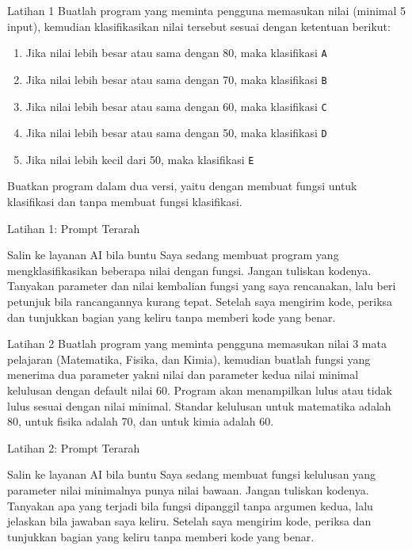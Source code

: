 \documentclass[aspectratio=169, table]{beamer}
\begin{document}
\begin{frame}[fragile,allowframebreaks=0.8]{Latihan 1}
\footnotesize
Buatlah program yang meminta pengguna memasukan nilai (minimal 5 input), kemudian klasifikasikan nilai tersebut sesuai dengan ketentuan berikut:
    \begin{enumerate}
        \item Jika nilai lebih besar atau sama dengan 80, maka klasifikasi \texttt{A}
        \item Jika nilai lebih besar atau sama dengan 70, maka klasifikasi \texttt{B}
        \item Jika nilai lebih besar atau sama dengan 60, maka klasifikasi \texttt{C}
        \item Jika nilai lebih besar atau sama dengan 50, maka klasifikasi \texttt{D}
        \item Jika nilai lebih kecil dari 50, maka klasifikasi \texttt{E}
    \end{enumerate}
    Buatkan program dalam dua versi, yaitu dengan membuat fungsi untuk klasifikasi dan tanpa membuat fungsi klasifikasi.
\end{frame}

\begin{frame}{Latihan 1: Prompt Terarah}
\begin{block}{Salin ke layanan AI bila buntu}
\small Saya sedang membuat program yang mengklasifikasikan beberapa nilai dengan fungsi. Jangan tuliskan kodenya. Tanyakan parameter dan nilai kembalian fungsi yang saya rencanakan, lalu beri petunjuk bila rancangannya kurang tepat. Setelah saya mengirim kode, periksa dan tunjukkan bagian yang keliru tanpa memberi kode yang benar.
\end{block}
\end{frame}

\begin{frame}[fragile,allowframebreaks=0.8]{Latihan 2}
\footnotesize
Buatlah program yang meminta pengguna memasukan nilai 3 mata pelajaran (Matematika, Fisika, dan Kimia), kemudian buatlah fungsi yang menerima dua parameter yakni nilai dan parameter kedua nilai minimal kelulusan dengan default nilai 60. Program akan menampilkan lulus atau tidak lulus sesuai dengan nilai minimal. Standar kelulusan untuk matematika adalah 80, untuk fisika adalah 70, dan untuk kimia adalah 60.
\end{frame}

\begin{frame}{Latihan 2: Prompt Terarah}
\begin{block}{Salin ke layanan AI bila buntu}
\small Saya sedang membuat fungsi kelulusan yang parameter nilai minimalnya punya nilai bawaan. Jangan tuliskan kodenya. Tanyakan apa yang terjadi bila fungsi dipanggil tanpa argumen kedua, lalu jelaskan bila jawaban saya keliru. Setelah saya mengirim kode, periksa dan tunjukkan bagian yang keliru tanpa memberi kode yang benar.
\end{block}
\end{frame}
\end{document}
